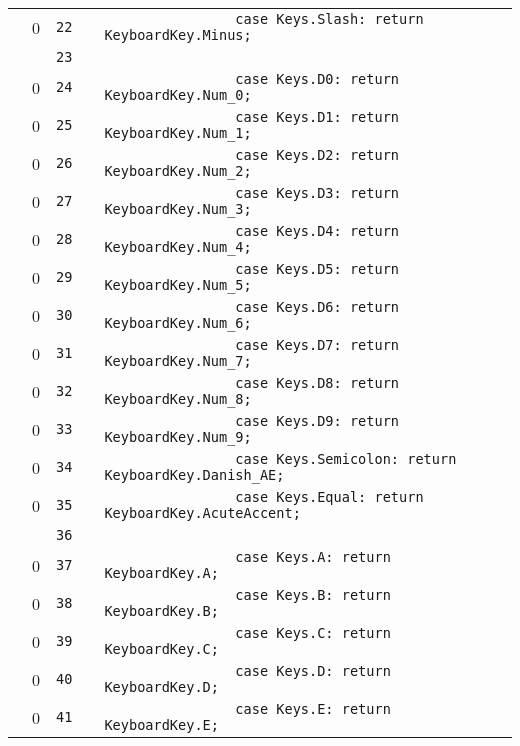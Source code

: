 \documentclass[a4paper,landscape,10pt]{article}
\begin{document}
\begin{longtable}[l]{lrrll}
\cellcolor{red} & 0 & \verb~22~ & & \verb~                case Keys.Slash: return KeyboardKey.Minus;~\\
\cellcolor{gray} &  & \verb~23~ & & \verb~~\\
\cellcolor{red} & 0 & \verb~24~ & & \verb~                case Keys.D0: return KeyboardKey.Num_0;~\\
\cellcolor{red} & 0 & \verb~25~ & & \verb~                case Keys.D1: return KeyboardKey.Num_1;~\\
\cellcolor{red} & 0 & \verb~26~ & & \verb~                case Keys.D2: return KeyboardKey.Num_2;~\\
\cellcolor{red} & 0 & \verb~27~ & & \verb~                case Keys.D3: return KeyboardKey.Num_3;~\\
\cellcolor{red} & 0 & \verb~28~ & & \verb~                case Keys.D4: return KeyboardKey.Num_4;~\\
\cellcolor{red} & 0 & \verb~29~ & & \verb~                case Keys.D5: return KeyboardKey.Num_5;~\\
\cellcolor{red} & 0 & \verb~30~ & & \verb~                case Keys.D6: return KeyboardKey.Num_6;~\\
\cellcolor{red} & 0 & \verb~31~ & & \verb~                case Keys.D7: return KeyboardKey.Num_7;~\\
\cellcolor{red} & 0 & \verb~32~ & & \verb~                case Keys.D8: return KeyboardKey.Num_8;~\\
\cellcolor{red} & 0 & \verb~33~ & & \verb~                case Keys.D9: return KeyboardKey.Num_9;~\\
\cellcolor{red} & 0 & \verb~34~ & & \verb~                case Keys.Semicolon: return KeyboardKey.Danish_AE;~\\
\cellcolor{red} & 0 & \verb~35~ & & \verb~                case Keys.Equal: return KeyboardKey.AcuteAccent;~\\
\cellcolor{gray} &  & \verb~36~ & & \verb~~\\
\cellcolor{red} & 0 & \verb~37~ & & \verb~                case Keys.A: return KeyboardKey.A;~\\
\cellcolor{red} & 0 & \verb~38~ & & \verb~                case Keys.B: return KeyboardKey.B;~\\
\cellcolor{red} & 0 & \verb~39~ & & \verb~                case Keys.C: return KeyboardKey.C;~\\
\cellcolor{red} & 0 & \verb~40~ & & \verb~                case Keys.D: return KeyboardKey.D;~\\
\cellcolor{red} & 0 & \verb~41~ & & \verb~                case Keys.E: return KeyboardKey.E;~\\

\end{longtable}
\end{document}

